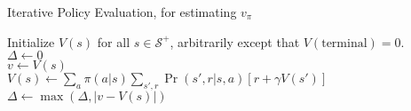\documentclass[12pt]{article}
\begin{document}
\begin{algorithm}
  \caption{Iterative Policy Evaluation, for estimating $v_\pi$} 
  Initialize $V(s)$ for all $s \in \mathcal S^+$, arbitrarily except that   $V(\textrm{terminal}) = 0$. \\
\While{$\Delta \geq \theta$} {
  $\Delta \gets 0$ \\
   {
    $v \gets V(s)$\\
    $V(s) \gets \sum_a \pi(a|s) \sum_{s',r} \Pr(s', r| s, a) \left[ r + \gamma       V(s')\right]$ \\
    $\Delta \gets \max\left(\Delta, |v - V(s)|\right)$
  }
}
\end{algorithm}
\end{document}
